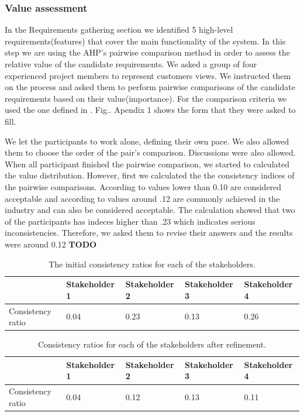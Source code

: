 \subsubsection{Value assessment}

In the Requirements gathering section we identified 5 high-level requirements(features) that cover the main functionality of the system. In this step we are using the AHP's pairwise comparison method in order to assess the relative value of the candidate requirements. We asked a group of four experienced project members to represent customers views. We instructed them on the process and asked them to perform  pairwise comparisons of the candidate requirements based on their value(importance). For the comparison criteria we used the one defined in \cite{}. Fig.. Apendix 1 shows the form that they were asked to fill.

We let the participants to work alone, defining their own pace. We also allowed them to choose the order of the pair's comparison. Discussions were also allowed. When all participant finished the pairwise comparison, we started to calculated the value distribution. However, first we calculated the the consistency indices of the pairwise comparisons. According to \cite{AHP}
 values lower than 0.10 are considered acceptable and according to \cite{Karlsson} values around .12 are commonly achieved in the industry and can also be considered acceptable. The calculation showed that two of the participants has indeces higher than .23 which indicates serious inconsistencies. Therefore, we asked them to revise their answers and the results were around 0.12 \textbf{TODO}
 
 \begin{table}[h!]
  \begin{center}
    \begin{tabular}{| l | l | l | l | l |}
    \hline
    & Stakeholder 1 & Stakeholder 2 & Stakeholder 3 & Stakeholder 4 \\	 \hline
    Consistency ratio & 0.04 & 0.23 & 0.13 & 0.26 \\
    \hline
    \end{tabular}
  \end{center}
  \caption{The initial consistency ratios for each of the stakeholders.}
\end{table}


 \begin{table}[h!]
  \begin{center}
    \begin{tabular}{| l | l | l | l | l |}
    \hline
    & Stakeholder 1 & Stakeholder 2 & Stakeholder 3 & Stakeholder 4 \\	 \hline
    Consistency ratio & 0.04 & 0.12 & 0.13 & 0.11 \\
    \hline
    \end{tabular}
  \end{center}
  \caption{Consistency ratios for each of the stakeholders after refinement.}
\end{table}

